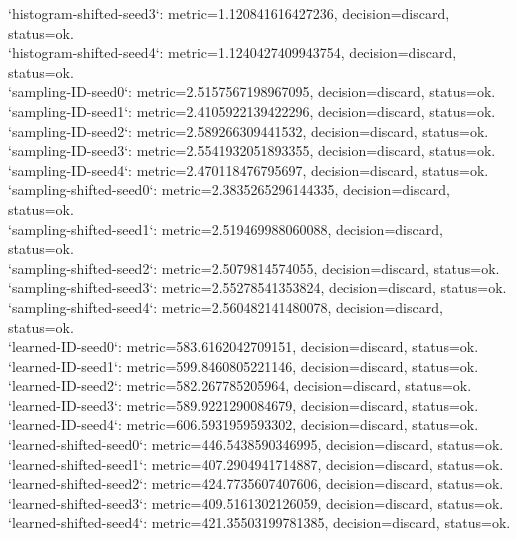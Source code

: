 \documentclass{article}
\begin{document}
\noindent `histogram-shifted-seed3`: metric=1.120841616427236, decision=discard, status=ok.\\
\noindent `histogram-shifted-seed4`: metric=1.1240427409943754, decision=discard, status=ok.\\
\noindent `sampling-ID-seed0`: metric=2.5157567198967095, decision=discard, status=ok.\\
\noindent `sampling-ID-seed1`: metric=2.4105922139422296, decision=discard, status=ok.\\
\noindent `sampling-ID-seed2`: metric=2.589266309441532, decision=discard, status=ok.\\
\noindent `sampling-ID-seed3`: metric=2.5541932051893355, decision=discard, status=ok.\\
\noindent `sampling-ID-seed4`: metric=2.470118476795697, decision=discard, status=ok.\\
\noindent `sampling-shifted-seed0`: metric=2.3835265296144335, decision=discard, status=ok.\\
\noindent `sampling-shifted-seed1`: metric=2.519469988060088, decision=discard, status=ok.\\
\noindent `sampling-shifted-seed2`: metric=2.5079814574055, decision=discard, status=ok.\\
\noindent `sampling-shifted-seed3`: metric=2.55278541353824, decision=discard, status=ok.\\
\noindent `sampling-shifted-seed4`: metric=2.560482141480078, decision=discard, status=ok.\\
\noindent `learned-ID-seed0`: metric=583.6162042709151, decision=discard, status=ok.\\
\noindent `learned-ID-seed1`: metric=599.8460805221146, decision=discard, status=ok.\\
\noindent `learned-ID-seed2`: metric=582.267785205964, decision=discard, status=ok.\\
\noindent `learned-ID-seed3`: metric=589.9221290084679, decision=discard, status=ok.\\
\noindent `learned-ID-seed4`: metric=606.5931959593302, decision=discard, status=ok.\\
\noindent `learned-shifted-seed0`: metric=446.5438590346995, decision=discard, status=ok.\\
\noindent `learned-shifted-seed1`: metric=407.2904941714887, decision=discard, status=ok.\\
\noindent `learned-shifted-seed2`: metric=424.7735607407606, decision=discard, status=ok.\\
\noindent `learned-shifted-seed3`: metric=409.5161302126059, decision=discard, status=ok.\\
\noindent `learned-shifted-seed4`: metric=421.35503199781385, decision=discard, status=ok.\\
\end{document}
